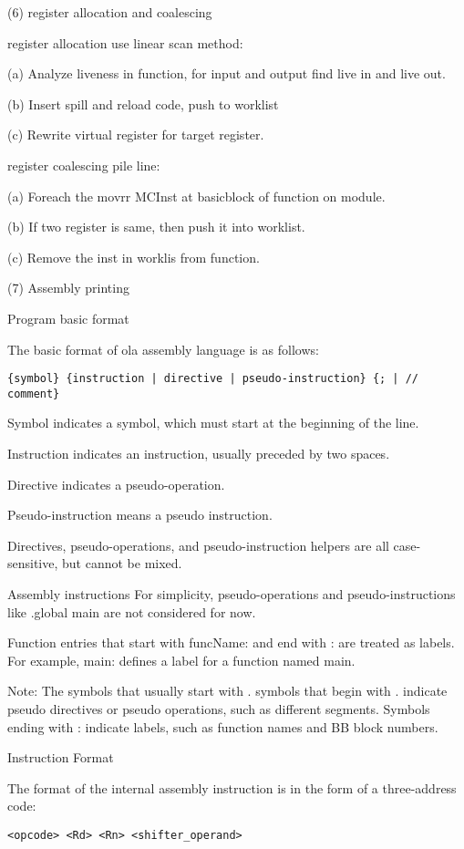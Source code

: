 \begin{itemize}
(6) register allocation and coalescing

register allocation use linear scan method:\par
(a) Analyze liveness in function, for input and output find live in and live out.\par
(b) Insert spill and reload code, push to worklist\par
(c) Rewrite virtual register for target register.

register coalescing pile line:

(a) Foreach the movrr MCInst at basicblock of function on module.\par
(b) If two register is same, then push it into worklist.\par
(c) Remove the inst in worklis from function.\par

(7) Assembly printing

Program basic format\par
The basic format of ola assembly language is as follows:
\begin{lstlisting}[language={}]
{symbol} {instruction | directive | pseudo-instruction} {; | // comment}
\end{lstlisting}

Symbol indicates a symbol, which must start at the beginning of the line.\par
Instruction indicates an instruction, usually preceded by two spaces.\par
Directive indicates a pseudo-operation.\par
Pseudo-instruction means a pseudo instruction.\par
Directives, pseudo-operations, and pseudo-instruction helpers are all case-sensitive, but cannot be mixed.\apr

Assembly instructions
For simplicity, pseudo-operations and pseudo-instructions like .global main are not considered for now.\par

Function entries that start with funcName: and end with : are treated as labels. For example, main: defines a label for a function named main.

Note: The symbols that usually start with . symbols that begin with . indicate pseudo directives or pseudo operations, such as different segments. Symbols ending with : indicate labels, such as function names and BB block numbers.

Instruction Format\par
The format of the internal assembly instruction is in the form of a three-address code: 
\begin{lstlisting}[language={}]
    <opcode> <Rd> <Rn> <shifter_operand>
\end{lstlisting}


\end{itemize}
